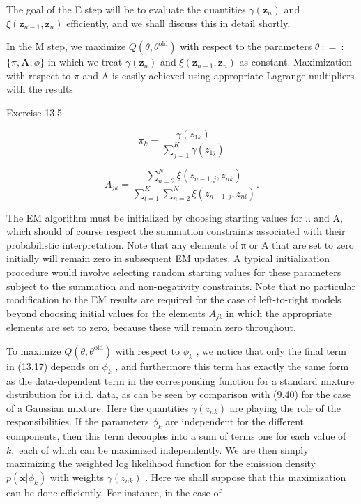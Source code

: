 \documentclass[
  10
]{article}
\begin{document}
The goal of the E step will be to evaluate the quantities
\(\gamma ( \mathbf { z } _ { n } )\) and
\(\xi ( \mathbf { z } _ { n - 1 } , \mathbf { z } _ { n } )\)
efficiently, and we shall discuss this in detail shortly.

In the M step, we maximize
\(Q ( \theta , \theta ^ { \mathrm { o l d } } )\) with respect to the
parameters \(\theta \ : = \ :\) \(\{ \pi , \mathbf { A } , \phi \}\) in
which we treat \(\gamma ( \mathbf { z } _ { n } )\) and
\(\xi ( \mathbf { z } _ { n - 1 } , \mathbf { z } _ { n } )\) as
constant. Maximization with respect to \(\pi\) and A is easily achieved
using appropriate Lagrange multipliers with the results

Exercise 13.5

\[
\pi_ {k} = \frac {\gamma (z _ {1 k})}{\sum_ {j = 1} ^ {K} \gamma (z _ {1 j})}\tag{13.18}
\]

\[
A _ {j k} = \frac {\sum_ {n = 2} ^ {N} \xi (z _ {n - 1 , j} , z _ {n k})}{\sum_ {l = 1} ^ {K} \sum_ {n = 2} ^ {N} \xi (z _ {n - 1 , j} , z _ {n l})}.\tag{13.19}
\]

The EM algorithm must be initialized by choosing starting values for π
and A, which should of course respect the summation constraints
associated with their probabilistic interpretation. Note that any
elements of π or A that are set to zero initially will remain zero in
subsequent EM updates. A typical initialization procedure would involve
selecting random starting values for these parameters subject to the
summation and non-negativity constraints. Note that no particular
modification to the EM results are required for the case of
left-to-right models beyond choosing initial values for the elements
\(A _ { j k }\) in which the appropriate elements are set to zero,
because these will remain zero throughout.

To maximize \(Q ( \theta , \theta ^ { \mathrm { o l d } } )\) with
respect to \(\phi _ { k }\) , we notice that only the final term in
(13.17) depends on \(\phi _ { k }\) , and furthermore this term has
exactly the same form as the data-dependent term in the corresponding
function for a standard mixture distribution for i.i.d. data, as can be
seen by comparison with (9.40) for the case of a Gaussian mixture. Here
the quantities \(\gamma ( z _ { n k } )\) are playing the role of the
responsibilities. If the parameters \(\phi _ { k }\) are independent for
the different components, then this term decouples into a sum of terms
one for each value of \(k ,\) each of which can be maximized
independently. We are then simply maximizing the weighted log likelihood
function for the emission density \(p ( \mathbf { x } | \phi _ { k } )\)
with weights \(\gamma ( z _ { n k } )\) . Here we shall suppose that
this maximization can be done efficiently. For instance, in the case of
\end{document}
